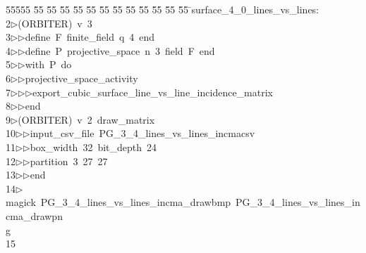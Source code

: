 %
%
\begin{tabbing}
55555 \= 55 \= 55 \= 55 \= 55 \= 55 \= 55 \= 55 \= 55 \= 55 \= 55 \= 55 \= 55 \= \>surface\_4\_0\_lines\_vs\_lines:\\[0pt]
2\>$\triangleright$\>(ORBITER)\ v\ 3\ \\[0pt]
3\>$\triangleright$\>$\triangleright$\>define\ F\ finite\_field\ q\ 4\ end\ \\[0pt]
4\>$\triangleright$\>$\triangleright$\>define\ P\ projective\_space\ n\ 3\ field\ F\ end\ \\[0pt]
5\>$\triangleright$\>$\triangleright$\>with\ P\ do\ \\[0pt]
6\>$\triangleright$\>$\triangleright$\>projective\_space\_activity\ \\[0pt]
7\>$\triangleright$\>$\triangleright$\>$\triangleright$\>export\_cubic\_surface\_line\_vs\_line\_incidence\_matrix\ \\[0pt]
8\>$\triangleright$\>$\triangleright$\>end\\[0pt]
9\>$\triangleright$\>(ORBITER)\ v\ 2\ draw\_matrix\ \\[0pt]
10\>$\triangleright$\>$\triangleright$\>input\_csv\_file\ PG\_3\_4\_lines\_vs\_lines\_incmacsv\ \\[0pt]
11\>$\triangleright$\>$\triangleright$\>box\_width\ 32\ bit\_depth\ 24\ \\[0pt]
12\>$\triangleright$\>$\triangleright$\>partition\ 3\ 27\ 27\ \\[0pt]
13\>$\triangleright$\>$\triangleright$\>end\\[0pt]
14\>$\triangleright$\>magick\ PG\_3\_4\_lines\_vs\_lines\_incma\_drawbmp\ PG\_3\_4\_lines\_vs\_lines\_incma\_drawpn\\[0pt]
\>g\\[0pt]
15\>\end{tabbing}
